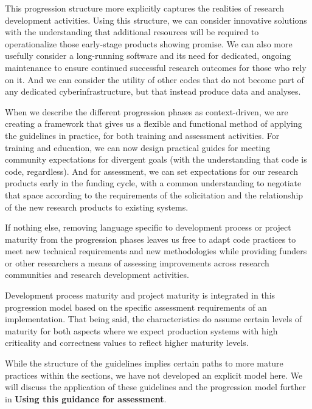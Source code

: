 \documentclass{article}
\begin{document}
This progression structure more explicitly captures the realities of research development activities. Using this structure, we can consider innovative solutions with the understanding that additional resources will be required to operationalize those early-stage products showing promise. We can also more usefully consider a long-running software and its need for dedicated, ongoing maintenance to ensure continued successful research outcomes for those who rely on it. And we can consider the utility of other codes that do not become part of any dedicated cyberinfrastructure, but that instead produce data and analyses. 
 
When we describe the different progression phases as context-driven, we are creating a framework that gives us a flexible and functional method of applying the guidelines in practice, for both training and assessment activities. For training and education, we can now design practical guides for meeting community expectations for divergent goals (with the understanding that code is code, regardless). And for assessment, we can set expectations for our research products early in the funding cycle, with a common understanding to negotiate that space according to the requirements of the solicitation and the relationship of the new research products to existing systems. 
 
If nothing else, removing language specific to development process or project maturity from the progression phases leaves us free to adapt code practices to meet new technical requirements and new methodologies while providing funders or other researchers a means of assessing improvements across research communities and research development activities. 
 
Development process maturity and project maturity is integrated in this progression model based on the specific assessment requirements of an implementation. That being said, the characteristics do assume certain levels of maturity for both aspects where we expect production systems with high criticality and correctness values to reflect higher maturity levels. 
 
While the structure of the guidelines implies certain paths to more mature practices within the sections, we have not developed an explicit model here. We will discuss the application of these guidelines and the progression model further in \textbf{Using this guidance for assessment}. 
\end{document}
